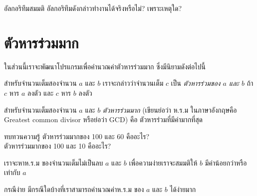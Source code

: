 \begin{quiz}{อัล{\wbr}กอ{\wbr}ริ{\wbr}ทึม{\wbr}สมมติ}
อัล{\wbr}กอ{\wbr}ริ{\wbr}ทึม{\wbr}ดังกล่าว{\wbr}ทำงาน{\wbr}ได้{\wbr}จริง{\wbr}หรือ{\wbr}ไม่? เพราะ{\wbr}เหตุใด?
\end{quiz}


\section{ตัวหารร่วมมาก}

ใน{\wbr}ส่วน{\wbr}นี้{\wbr}เรา{\wbr}จะ{\wbr}พัฒนา{\wbr}โปรแกรม{\wbr}เพื่อ{\wbr}คำนวณ{\wbr}ค่าตัว{\wbr}หารร่วมมาก ซึ่ง{\wbr}มี{\wbr}นิยาม{\wbr}ดังต่อไปนี้{\wbr}

สำหรับ{\wbr}จำนวนเต็ม{\wbr}สอง{\wbr}จำนวน $a$ และ $b$ เรา{\wbr}จะ{\wbr}กล่าว{\wbr}ว่า{\wbr}จำนวนเต็ม $c$ เป็น {\em
ตัวหาร{\wbr}ร่วม{\wbr}ของ $a$ และ $b$} ถ้า $c$ หาร $a$ ลงตัว และ $c$ หาร $b$ ลงตัว{\wbr}

สำหรับ{\wbr}จำนวนเต็ม{\wbr}สอง{\wbr}จำนวน $a$ และ $b$ {\em ตัวหารร่วมมาก} (เขียน{\wbr}ย่อ{\wbr}ว่า ห.{\wbr}ร.{\wbr}ม
ใน{\wbr}ภาษาอังกฤษ{\wbr}คือ Greatest common divisor หรือ{\wbr}ย่อ{\wbr}ว่า GCD)  คือ{\wbr}
ตัวหาร{\wbr}ร่วม{\wbr}ที่{\wbr}มี{\wbr}ค่า{\wbr}มาก{\wbr}ที่สุด{\wbr}

\begin{quiz}{ทบทวน{\wbr}ความ{\wbr}รู้}
ตัวหารร่วมมาก{\wbr}ของ 100 และ 60 คือ{\wbr}อะไร? \\
ตัวหารร่วมมาก{\wbr}ของ 100 และ 10 คือ{\wbr}อะไร?
\end{quiz}

เรา{\wbr}จะ{\wbr}หา{\wbr}ห.{\wbr}ร.{\wbr}ม ของ{\wbr}จำนวนเต็ม{\wbr}ไม่{\wbr}เป็น{\wbr}ลบ $a$ และ $b$ เพื่อ{\wbr}ความ{\wbr}ง่าย{\wbr}เรา{\wbr}จะ{\wbr}สมมติ{\wbr}ให้ $b$
มี{\wbr}ค่า{\wbr}น้อย{\wbr}กว่า{\wbr}หรือ{\wbr}เท่า{\wbr}กับ $a$

\begin{quiz}{กรณี{\wbr}ง่าย}
มี{\wbr}กรณี{\wbr}ใด{\wbr}บ้าง{\wbr}ที่{\wbr}เรา{\wbr}สามารถ{\wbr}คำนวณ{\wbr}ค่า{\wbr}ห.{\wbr}ร.{\wbr}ม ของ $a$ และ $b$ ได้{\wbr}ง่าย{\wbr}มาก{\wbr}
\end{quiz}



